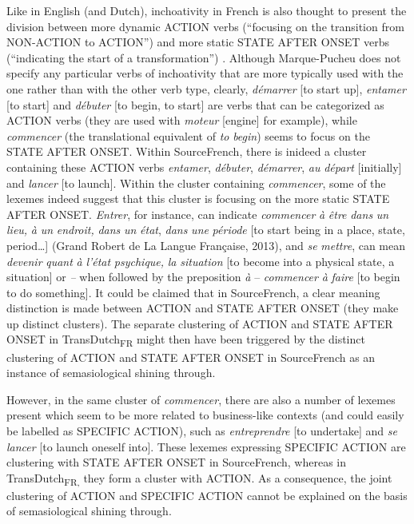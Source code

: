 Like in English (and Dutch), inchoativity in French is also thought to present the division between more dynamic ACTION verbs (“focusing on the transition from NON-ACTION to ACTION”) and more static STATE AFTER ONSET verbs (“indicating the start of a transformation”) \citep[241]{vogeleer_linchoatif:_1999}. Although Marque-Pucheu does not specify any particular verbs of inchoativity that are more typically used with the one rather than with the other verb type, clearly, \textit{démarrer} [to start up], \textit{entamer} [to start] and \textit{débuter} [to begin, to start] are verbs that can be categorized as ACTION verbs (they are used with \textit{moteur} [engine] for example), while \textit{commencer} (the translational equivalent of \textit{to} \textit{begin}) seems to focus on the STATE AFTER ONSET. Within SourceFrench, there is inideed a cluster containing these ACTION verbs \textit{entamer}, \textit{débuter}, \textit{démarrer}, \textit{au} \textit{départ} [initially] and \textit{lancer} [to launch]. Within the cluster containing \textit{commencer}, some of the lexemes indeed suggest that this cluster is focusing on the more static STATE AFTER ONSET. \textit{Entrer}, for instance, can indicate \textit{commencer} \textit{à} \textit{être} \textit{dans} \textit{un} \textit{lieu,} \textit{à} \textit{un} \textit{endroit,} \textit{dans} \textit{un} \textit{état}, \textit{dans} \textit{une} \textit{période} [to start being in a place, state, period…] (Grand Robert de La Langue Française, 2013), and \textit{se} \textit{mettre}, can mean \textit{devenir} \textit{quant} \textit{à} \textit{l'état} \textit{psychique,} \textit{la} \textit{situation} [to become into a physical state, a situation] or \textit{–} when followed by the preposition \textit{à} – \textit{commencer} \textit{à} \textit{faire} [to begin to do something]. It could be claimed that in SourceFrench, a clear meaning distinction is made between ACTION and STATE AFTER ONSET (they make up distinct clusters). The separate clustering of ACTION and STATE AFTER ONSET in TransDutch\textsubscript{FR} might then have been triggered by the distinct clustering of ACTION and STATE AFTER ONSET in SourceFrench as an instance of semasiological shining through.

However, in the same cluster of \textit{commencer}, there are also a number of lexemes present which seem to be more related to business-like contexts (and could easily be labelled as {SPECIFIC} ACTION), such as \textit{entreprendre} [to undertake] and \textit{se} \textit{lancer} [to launch oneself into]. These lexemes expressing {SPECIFIC} ACTION are clustering with STATE AFTER ONSET in SourceFrench, whereas in TransDutch\textsubscript{FR,} they form a cluster with ACTION. As a consequence, the joint clustering of ACTION and {SPECIFIC} ACTION cannot be explained on the basis of semasiological shining through.

